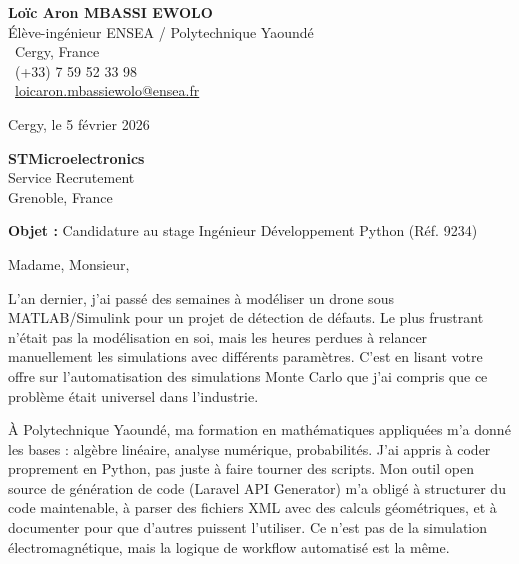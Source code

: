 \documentclass[a4paper,11pt]{article}
\begin{document}
\noindent
\begin{minipage}[t]{0.5\textwidth}
    \textbf{Loïc Aron MBASSI EWOLO}\\
    Élève-ingénieur ENSEA / Polytechnique Yaoundé\\[3pt]
    \faMapMarker\ Cergy, France\\
    \faPhone\ (+33) 7 59 52 33 98\\
    \faEnvelope\ \href{mailto:loicaron.mbassiewolo@ensea.fr}{loicaron.mbassiewolo@ensea.fr}
\end{minipage}
\hfill
\begin{minipage}[t]{0.4\textwidth}
    \raggedleft
    Cergy, le 5 février 2026
\end{minipage}

\vspace{1.2cm}

\hfill
\begin{minipage}[t]{0.5\textwidth}
    \raggedleft
    \textbf{STMicroelectronics}\\
    Service Recrutement\\
    Grenoble, France
\end{minipage}

\vspace{1cm}

\noindent\textbf{Objet :} Candidature au stage Ingénieur Développement Python (Réf. 9234)

\vspace{0.8cm}

Madame, Monsieur,

L'an dernier, j'ai passé des semaines à modéliser un drone sous MATLAB/Simulink pour un projet de détection de défauts. Le plus frustrant n'était pas la modélisation en soi, mais les heures perdues à relancer manuellement les simulations avec différents paramètres. C'est en lisant votre offre sur l'automatisation des simulations Monte Carlo que j'ai compris que ce problème était universel dans l'industrie.

À Polytechnique Yaoundé, ma formation en mathématiques appliquées m'a donné les bases : algèbre linéaire, analyse numérique, probabilités. J'ai appris à coder proprement en Python, pas juste à faire tourner des scripts. Mon outil open source de génération de code (Laravel API Generator) m'a obligé à structurer du code maintenable, à parser des fichiers XML avec des calculs géométriques, et à documenter pour que d'autres puissent l'utiliser. Ce n'est pas de la simulation électromagnétique, mais la logique de workflow automatisé est la même.
\end{document}
